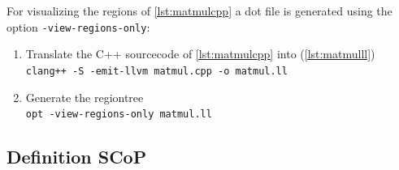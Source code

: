 For visualizing the regions of \autoref{lst:matmulcpp} a dot file is generated using the option \texttt{-view-regions-only}:
\begin{enumerate}
    \item Translate the C++ sourcecode of \autoref{lst:matmulcpp} into \llvmir (\autoref{lst:matmulll})\\
        \texttt{clang++ -S -emit-llvm matmul.cpp -o matmul.ll}
    \item Generate the regiontree\\
        \texttt{opt -view-regions-only matmul.ll}
\end{enumerate}
\subsection{Definition SCoP}\label{subsec:definitionScop}

